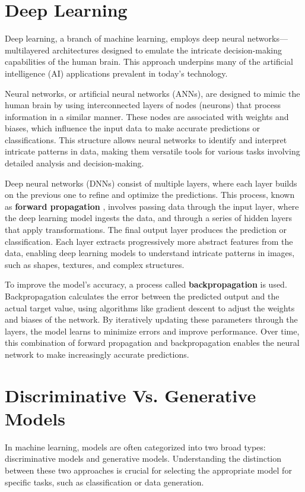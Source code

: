 \documentclass[12pt,DIV14,BCOR12mm,a4paper,footinclude=false,headinclude,parskip=half-,twoside,openright,cleardoublepage=empty,toc=index,bibliography=totoc,listof=totoc]{scrreprt}
\numberwithin{equation}{chapter}
\begin{document}
\section{Deep Learning}
Deep learning, a branch of machine learning, employs deep neural networks—multilayered architectures designed to emulate the intricate decision-making capabilities of the human brain. This approach underpins many of the artificial intelligence (AI) applications prevalent in today’s technology.

Neural networks, or artificial neural networks (ANNs), are designed to mimic the human brain by using interconnected layers of nodes (neurons) that process information in a similar manner. These nodes are associated with weights and biases, which influence the input data to make accurate predictions or classifications. This structure allows neural networks to identify and interpret intricate patterns in data, making them versatile tools for various tasks involving detailed analysis and decision-making.

Deep neural networks (DNNs) consist of multiple layers, where each layer builds on the previous one to refine and optimize the predictions. This process, known as \textbf{forward propagation} , involves passing data through the input layer, where the deep learning model ingests the data, and through a series of hidden layers that apply transformations. The final output layer produces the prediction or classification. Each layer extracts progressively more abstract features from the data, enabling deep learning models to understand intricate patterns in images, such as shapes, textures, and complex structures.

To improve the model's accuracy, a process called \textbf{backpropagation} is used. Backpropagation calculates the error between the predicted output and the actual target value, using algorithms like gradient descent to adjust the weights and biases of the network. By iteratively updating these parameters through the layers, the model learns to minimize errors and improve performance. Over time, this combination of forward propagation and backpropagation enables the neural network to make increasingly accurate predictions.
\section{Discriminative Vs. Generative Models}
In machine learning, models are often categorized into two broad types: discriminative models and generative models. Understanding the distinction between these two approaches is crucial for selecting the appropriate model for specific tasks, such as classification or data generation.
\end{document}
